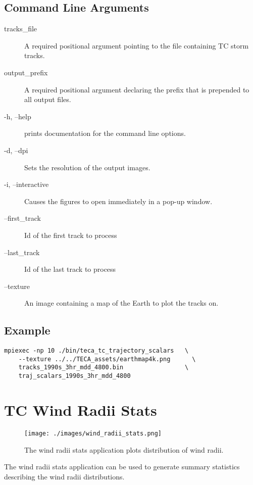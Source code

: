 \documentclass[a4paper,10pt,DIV=12]{scrreprt}
\begin{document}
\subsection{Command Line Arguments}
\begin{description}
\item[tracks\_file] A required positional argument pointing to the file containing TC storm tracks.
\item[output\_prefix] A required positional argument declaring the prefix that is prepended to all output files.
\item[-h, --help] prints documentation for the command line options.
\item[-d, --dpi] Sets the resolution of the output images.
\item[-i, --interactive] Causes the figures to open immediately in a pop-up window.
\item[--first\_track] Id of the first track to process
\item[--last\_track] Id of the last track to process
\item[--texture] An image containing a map of the Earth to plot the tracks on.
\end{description}

\subsection{Example}
\begin{verbatim}
mpiexec -np 10 ./bin/teca_tc_trajectory_scalars   \
    --texture ../../TECA_assets/earthmap4k.png      \
    tracks_1990s_3hr_mdd_4800.bin                 \
    traj_scalars_1990s_3hr_mdd_4800
\end{verbatim}

\section{TC Wind Radii Stats}
\begin{wrapfigure}{r}{0.5\textwidth}
 \centering
 \texttt{[image: ./images/wind\_radii\_stats.png]}
 \caption{The wind radii stats application plots distribution of wind radii.}
 \label{fig:traj_scalar}
 \vspace{-110pt}
\end{wrapfigure}
The wind radii stats application can be used to generate summary statistics describing the wind radii distributions.
\end{document}
